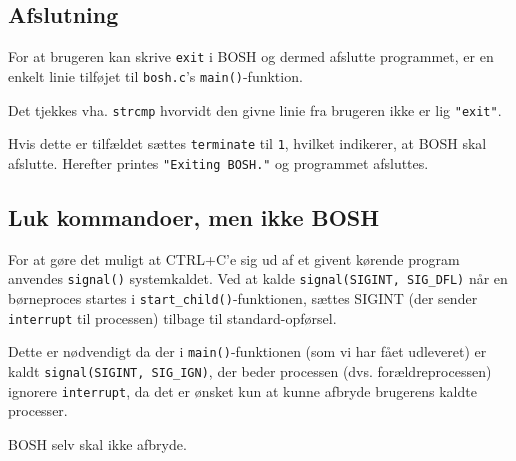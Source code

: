 \subsection{Afslutning}
For at brugeren kan skrive \verb+exit+ i BOSH og dermed afslutte programmet, er en enkelt linie tilføjet til \verb+bosh.c+'s \verb+main()+-funktion. 

Det tjekkes vha. \verb+strcmp+ hvorvidt den givne linie fra brugeren ikke er lig \verb+"exit"+.

Hvis dette er tilfældet sættes \verb+terminate+ til \verb+1+, hvilket indikerer, at BOSH skal afslutte. Herefter printes \verb+"Exiting BOSH."+ og programmet afsluttes. 
\subsection{Luk kommandoer, men ikke BOSH}
For at gøre det muligt at CTRL+C'e sig ud af et givent kørende program anvendes \verb+signal()+ systemkaldet. Ved at kalde \verb+signal(SIGINT, SIG_DFL)+ når en børneproces startes i \verb+start_child()+-funktionen, sættes SIGINT (der sender \verb+interrupt+ til processen) tilbage til standard-opførsel.

Dette er nødvendigt da der i \verb+main()+-funktionen (som vi har fået udleveret) er kaldt \verb+signal(SIGINT, SIG_IGN)+, der beder processen (dvs. forældreprocessen) ignorere \verb+interrupt+, da det er ønsket kun at kunne afbryde brugerens kaldte processer. 

BOSH selv skal ikke afbryde.

